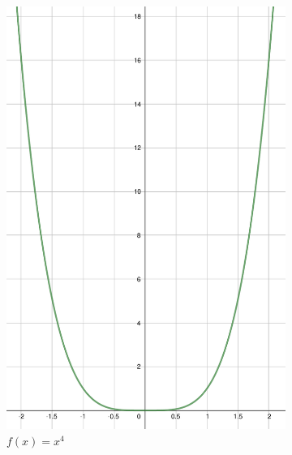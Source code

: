 \begin{figure}[h]
    \centering
    \begin{subfigure}{0.35\textwidth}
        \includegraphics[width=\textwidth]{tex/chapter_2/assets/y=x^4.pdf}
        \caption*{$f(x) = x^4$}
    \end{subfigure}
    \hfill
    \begin{subfigure}{0.35\textwidth}

\end{subfigure}
\end{figure}
